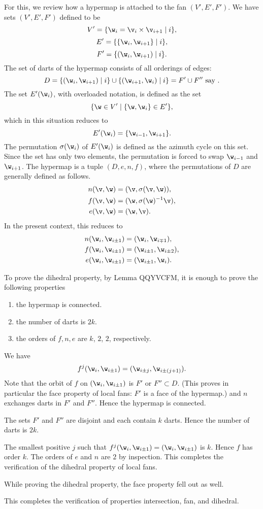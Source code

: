 For this, we review how
a hypermap is attached to the fan $(V',E',F')$.
We have sets $(V',E',F')$ defined to be
\[
V' = \{ \w_i = \v_i \times \v_{i+1}\mid i\},
\]
\[
E' = \{\{\w_i,\w_{i+1}\}\mid i\},
\]
\[
F' = \{(\w_i,\w_{i+1})\mid i\}.
\]
The set of darts of the hypermap consists of all orderings of edges:
\[
D  =\{(\w_i,\w_{i+1}) \mid i\} \cup \{(\w_{i+1},\w_i)\mid i\} = F' \cup F'' \text{ say }.
\]
The set $E'(\w_i)$, with overloaded notation, is defined as the set
\[
\{\w\in V' \mid \{\w,\w_i\}\in E'\},
\]
which in this situation reduces to
\[
E'(\w_i) = \{\w_{i-1},\w_{i+1}\}.
\]
The permutation $\sigma(\w_i)$ of $E'(\w_i)$ is defined as the azimuth
cycle on this set.  Since the set has only two elements, the permutation is
forced to swap $\w_{i-1}$ and $\w_{i+1}$.
The hypermap is a tuple $(D,e,n,f)$, where the permutations of $D$ are
generally defined as follows.
\begin{align*}n(\v,\w) &= (\v,\sigma(\v,\w)),\\
f (\v,\w) &= (\w,\sigma(\w)^{-1} \v),\\
e (\v,\w) &= (\w,\v).
\end{align*}
In the present context, this reduces to
\begin{align*}n(\w_i,\w_{i\pm 1}) &= (\w_i,\w_{i\mp 1}),\\
f (\w_i,\w_{i\pm1}) &= (\w_{i\pm1},\w_{i\pm2}),\\
e (\w_i,\w_{i\pm 1}) &= (\w_{i\pm 1},\w_i).
\end{align*}

To prove the dihedral property, by Lemma QQYVCFM, it is enough
to prove the following properties
\begin{enumerate}
\item the hypermap is connected.
\item the number of darts is $2k$.
\item the orders of $f,n,e$ are $k$, $2$, $2$, respectively.
\end{enumerate}

We have 
\[
f^j(\w_i,\w_{i\pm1}) = (\w_{i\pm j},\w_{i\pm (j+1)}).
\]
Note that the orbit of $f$ on $(\w_i,\w_{i\pm1})$ is $F'$ or $F''\subset D$.
(This proves in particular the face property of local fans: $F'$ is a face of the
hypermap.)
and $n$ exchanges darts in $F'$ and $F''$.  Hence the hypermap is connected.

The sets $F'$ and $F''$ are disjoint and each contain $k$ darts.  Hence
the number of darts is $2k$.

The smallest positive $j$ such that $f^j(\w_i,\w_{i\pm1}) = (\w_i,\w_{i\pm1})$
is $k$.  Hence $f$ has order $k$.  The orders of $e$ and $n$ are $2$ by
inspection.  This completes the verification of the dihedral property of
local fans.

While proving the dihedral property, the face property fell out as well.

This completes the verification of properties intersection, fan, and dihedral.



